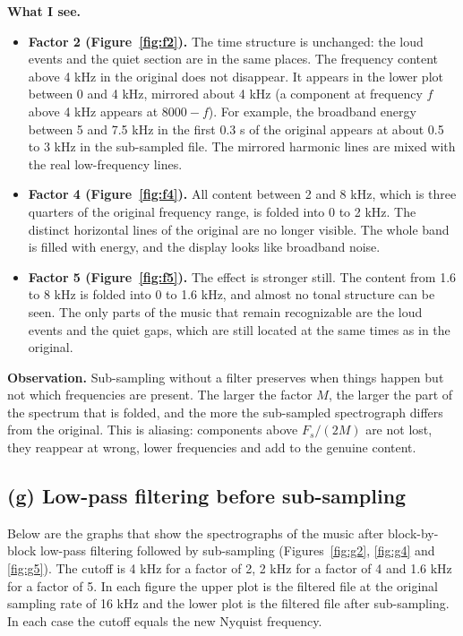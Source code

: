 \documentclass[12pt, letterpaper]{article}
\begin{document}
\textbf{What I see.}
\begin{itemize}
  \item \textbf{Factor 2 (Figure~\ref{fig:f2}).} The time structure is unchanged: the loud events and the quiet section are in the same places. The frequency content above 4 kHz in the original does not disappear. It appears in the lower plot between 0 and 4 kHz, mirrored about 4 kHz (a component at frequency $f$ above 4 kHz appears at $8000 - f$). For example, the broadband energy between 5 and 7.5 kHz in the first 0.3 s of the original appears at about 0.5 to 3 kHz in the sub-sampled file. The mirrored harmonic lines are mixed with the real low-frequency lines.
  \item \textbf{Factor 4 (Figure~\ref{fig:f4}).} All content between 2 and 8 kHz, which is three quarters of the original frequency range, is folded into 0 to 2 kHz. The distinct horizontal lines of the original are no longer visible. The whole band is filled with energy, and the display looks like broadband noise.
  \item \textbf{Factor 5 (Figure~\ref{fig:f5}).} The effect is stronger still. The content from 1.6 to 8 kHz is folded into 0 to 1.6 kHz, and almost no tonal structure can be seen. The only parts of the music that remain recognizable are the loud events and the quiet gaps, which are still located at the same times as in the original.
\end{itemize}

\textbf{Observation.} Sub-sampling without a filter preserves when things happen but not which frequencies are present. The larger the factor $M$, the larger the part of the spectrum that is folded, and the more the sub-sampled spectrograph differs from the original. This is aliasing: components above $F_s/(2M)$ are not lost, they reappear at wrong, lower frequencies and add to the genuine content.

\subsection{(g) Low-pass filtering before sub-sampling}

Below are the graphs that show the spectrographs of the music after block-by-block low-pass filtering followed by sub-sampling (Figures~\ref{fig:g2}, \ref{fig:g4} and \ref{fig:g5}). The cutoff is 4 kHz for a factor of 2, 2 kHz for a factor of 4 and 1.6 kHz for a factor of 5. In each figure the upper plot is the filtered file at the original sampling rate of 16 kHz and the lower plot is the filtered file after sub-sampling. In each case the cutoff equals the new Nyquist frequency.
\end{document}
